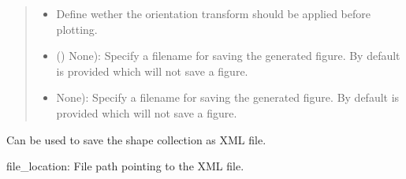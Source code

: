 \documentclass[letterpaper,10pt,english,openany,oneside]{sphinxmanual}
\begin{document}
\begin{fulllineitems}
\begin{fulllineitems}
\begin{quote}
\begin{description}
\begin{itemize}
\item {} 
\sphinxAtStartPar
{} \textendash{} Define wether the orientation transform should be applied before plotting.

\item {} 
\sphinxAtStartPar
\sphinxstyleliteralstrong{\sphinxupquote{(}}\sphinxstyleliteralstrong{\sphinxupquote{{[}}}\sphinxstyleliteralstrong{\sphinxupquote{{]}}} () \textendash{} None): Specify a filename  for saving the generated figure. By default  is provided which will not save a figure.

\item {} 
\sphinxAtStartPar
{} \textendash{} None): Specify a filename  for saving the generated figure. By default  is provided which will not save a figure.

\end{itemize}

\end{description}\end{quote}

\end{fulllineitems}


\begin{fulllineitems}
\label{\detokenize{pages/modules:lmd.lib.Collection.save}}
\sphinxAtStartPar
Can be used to save the shape collection as XML file.

\sphinxAtStartPar
file\_location: File path pointing to the XML file.

\end{fulllineitems}



\end{fulllineitems}
\end{document}
